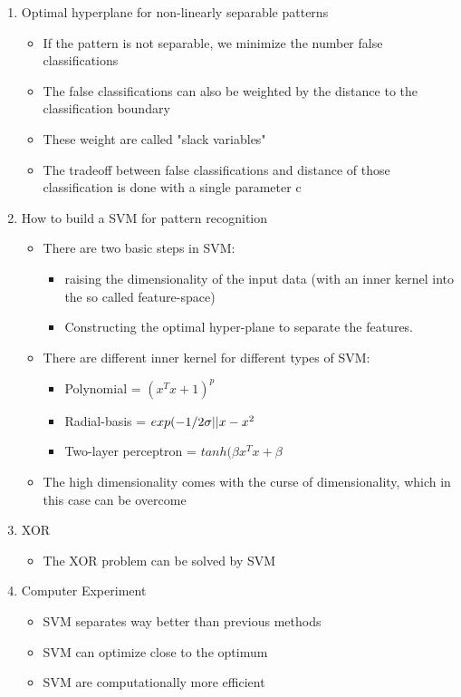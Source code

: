 \documentclass{scrartcl}
\begin{document}
\begin{enumerate}
\item Optimal hyperplane for non-linearly separable patterns
	\begin{itemize}
		\item If the pattern is not separable, we minimize the number false classifications
		\item The false classifications can also be weighted by the distance to the classification boundary
		\item These weight are called "slack variables"
		\item The tradeoff between false classifications and distance of those classification is done with a single parameter c
	\end{itemize}


\item How to build a SVM for pattern recognition 
	\begin{itemize}
	\item There are two basic steps in SVM:
		\begin{itemize}
		\item raising the dimensionality of the input data (with an inner kernel into the so called feature-space)
		\item Constructing the optimal hyper-plane to separate the features.
		\end{itemize}
	\item There are different inner kernel for different types of SVM:
		\begin{itemize}
		\item Polynomial = $(x^{T}x +1)^{p}$
		\item Radial-basis = $exp(-1/2\sigma ||x-x\\^{2}$
		\item Two-layer perceptron = $tanh(\beta x^{T}x+\beta$
		\end{itemize}
	\item The high dimensionality comes with the curse of dimensionality, which in this case can be overcome
	\end{itemize}


\item XOR
	\begin{itemize}
	\item  The XOR problem can be solved by SVM
	\end{itemize}


\item Computer Experiment
	\begin{itemize}
	\item SVM separates way better than previous methods
	\item SVM can optimize close to the optimum
	\item SVM are computationally more efficient
	\end{itemize}



\end{enumerate}
\end{document}
